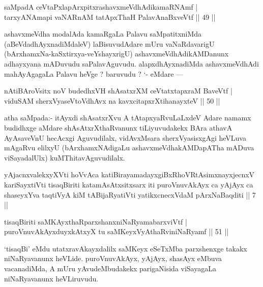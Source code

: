 \begin{shl}
saMpadA ceVtaPxlapArxpitxrashavxmeVdhAdikamaRNAmf |\\
tarxyANAmapi vaNARnAM tatApxThaH PalavAnaBxveVtf \hfill || 49 ||
\end{shl}

\begin{artha}
ashavxmeVdha modalAda kamaRgaLa Palavu saMpatitxniMda (aBeVdadhAyxnadiMdaleV) laBisuvudAdare mUru vaNaRdavarigU (bArxhamxNa-kaSxtirxya-veYshayxrigU) ashavxmeVdhAdikAMDanunx adhayxyana mADuvudu saPalavAguvudu. alapxdhAyxnadiMda ashavxmeVdhAdi mahAyAgagaLa Palavu heVge ? baruvudu ? `- eMdare ---
\end{artha}

\begin{shl}
nAtiBAroV\s sitx noV budedhxVH shAsatxrXM ceVtatxtapxraM BaveVtf |\\
viduSAM sherxVyaseV\s toV\s dhAvx na kavxcitapxrXtihanayxteV \hfill || 50 ||
\end{shl}

\begin{artha}
atha saMpada:- itAyxdi shAsatxrXvu A tAtapxyaRvuLaLxdeV Adare namamx budidhxge  aMdare shAsAtxrXthaRvanunx tiLiyuvudakekx BAra athavA AyAsaveVnU hecAcxgi Aguvudilalx, vidAvxMsara sherxVyasisxgAgi heVLuva mAgaRvu elilxyU (bArxhamxNAdigaLu ashavxmeVdhakAMDapATha mADuva viSayadalUlx) kuMThitavAguvudilalx.
\end{artha}


\begin{shl}
yAjacnxvalekxyXVti hoVvAca katiBirayamadayxgiBxRhoVRtAsimxnayxjecnxV kariSayxtiVti tisaqBiriti katamAsAtxsitxsarx iti puroVnuvAkAyx ca yAjAyx ca shaseyxYva taqtiVyA kiM tABijaRyatiVti yatikxcnecxVdaM pArxNaBaqditi || 7 ||
\end{shl}


\begin{shl}
tisaqBiriti saMKAyxthaRparxshanxniNaRyamabarxviVtf |\\
puroVnuvAkAyxduyxkAtxyX tu saMKeyxVyAthaRviniNaRyamf \hfill || 51 ||
\end{shl}

\begin{artha}
`tisaqBi' eMdu utatxravAkayxdalilx saMKeyx eSeTxMba parxshenxge takakx niNaRyavanunx heVLide. puroVnuvAkAyx, yAjAyx, shasAyx eMbuva vacanadiMda, A mUru yAvudeMbudakekx parigaNisida viSayagaLa niNaRyavanunx heVLiruvudu.
\end{artha}

